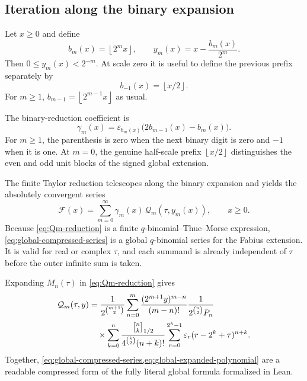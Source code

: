 \documentclass[11pt]{article}
\theoremstyle{definition}
\newcommand{\eps}{\varepsilon}
\newcommand{\Qbin}[3]{\genfrac{[}{]}{0pt}{}{#1}{#2}_{#3}}
\newcommand{\floor}[1]{\left\lfloor #1\right\rfloor}
\begin{document}
\subsection{Iteration along the binary expansion}

Let $x\ge0$ and define
\begin{equation}
  b_m(x)=\floor{2^mx},
  \qquad
  y_m(x)=x-\frac{b_m(x)}{2^m}.
  \label{eq:binary-prefix-tail}
\end{equation}
Then $0\le y_m(x)<2^{-m}$.  At scale zero it is useful to define the previous prefix separately by
\begin{equation}
  b_{-1}(x)=\floor{x/2}.
  \label{eq:previous-prefix-zero}
\end{equation}
For $m\ge1$, $b_{m-1}=\floor{2^{m-1}x}$ as usual.

The binary-reduction coefficient is
\begin{equation}
  \gamma_m(x)
  =\eps_{b_m(x)}\bigl(2b_{m-1}(x)-b_m(x)\bigr).
  \label{eq:gamma-binary}
\end{equation}
For $m\ge1$, the parenthesis is zero when the next binary digit is zero and $-1$ when it is one.  At $m=0$, the genuine half-scale prefix $\floor{x/2}$ distinguishes the even and odd unit blocks of the signed global extension.

The finite Taylor reduction telescopes along the binary expansion and yields the absolutely convergent series
\begin{equation}
  \mathcal F(x)
  =\sum_{m=0}^{\infty}\gamma_m(x)\,
    \mathcal Q_m(\tau,y_m(x)),
  \qquad x\ge0.
  \label{eq:global-compressed-series}
\end{equation}
Because \cref{eq:Qm-reduction} is a finite $q$-binomial--Thue--Morse expression, \cref{eq:global-compressed-series} is a global $q$-binomial series for the Fabius extension.  It is valid for real or complex $\tau$, and each summand is already independent of $\tau$ before the outer infinite sum is taken.

Expanding $M_n(\tau)$ in \cref{eq:Qm-reduction} gives
\begin{align}
  \mathcal Q_m(\tau,y)
  &=\frac{1}{2^{\binom{m+1}{2}}}
    \sum_{n=0}^{m}\frac{(2^{m+1}y)^{m-n}}{(m-n)!}
    \frac{1}{2^{\binom{n}{2}}P_n}\notag\\
  &\quad\times
    \sum_{k=0}^{n}
    \frac{\Qbin{n}{k}{1/2}}
         {4^{\binom{k}{2}}(n+k)!}
    \sum_{r=0}^{2^k-1}\eps_r(r-2^k+\tau)^{n+k}.
  \label{eq:global-expanded-polynomial}
\end{align}
Together, \cref{eq:global-compressed-series,eq:global-expanded-polynomial} are a readable compressed form of the fully literal global formula formalized in Lean.
\end{document}

